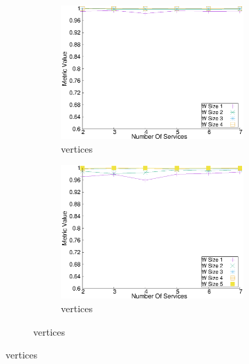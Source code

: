 \begin{figure}[H]
\begin{adjustbox}{minipage=\linewidth,scale=0.75}
\begin{subfigure}{0.45\textwidth}
        \begin{subfigure}{\textwidth}
          \includegraphics[width=\textwidth]{Images/graphs/window_quality_performance_diff_qual_n7_s7_50_80_n4}
          \caption{ vertices}
          \label{fig:quality_window_average_qualitative_n4}
        \end{subfigure}
        \begin{subfigure}{\textwidth}
          \includegraphics[width=\textwidth]{Images/graphs/window_quality_performance_diff_qual_n7_s7_50_80_n5}
          \caption{ vertices}
          \label{fig:quality_window_average_qualitative_n5}
        \end{subfigure}


\end{subfigure}
\end{adjustbox}
\end{figure}
